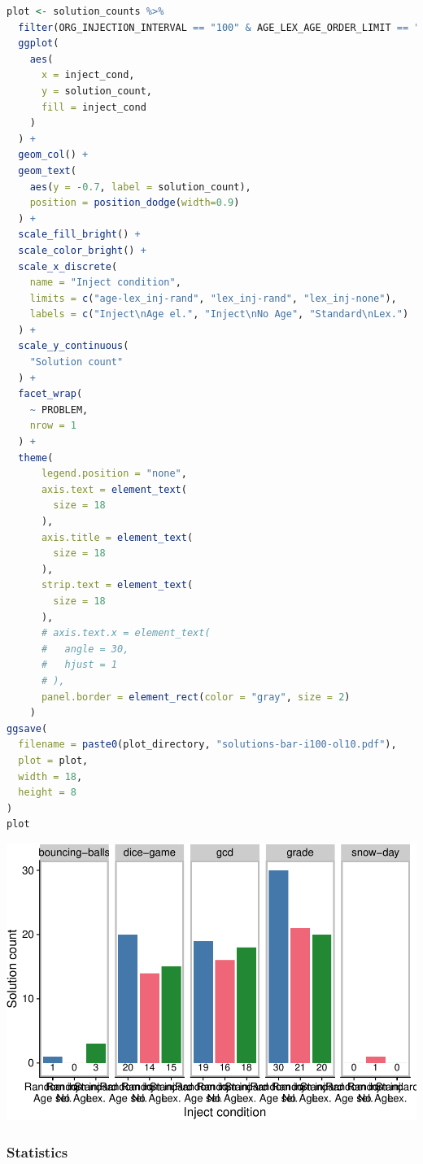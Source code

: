\documentclass[
]{book}
\begin{document}
\begin{lstlisting}[language=R]
plot <- solution_counts %>%
  filter(ORG_INJECTION_INTERVAL == "100" & AGE_LEX_AGE_ORDER_LIMIT == "10") %>%
  ggplot(
    aes(
      x = inject_cond,
      y = solution_count,
      fill = inject_cond
    )
  ) +
  geom_col() +
  geom_text(
    aes(y = -0.7, label = solution_count),
    position = position_dodge(width=0.9)
  ) +
  scale_fill_bright() +
  scale_color_bright() +
  scale_x_discrete(
    name = "Inject condition",
    limits = c("age-lex_inj-rand", "lex_inj-rand", "lex_inj-none"),
    labels = c("Inject\nAge el.", "Inject\nNo Age", "Standard\nLex.")
  ) +
  scale_y_continuous(
    "Solution count"
  ) +
  facet_wrap(
    ~ PROBLEM,
    nrow = 1
  ) +
  theme(
      legend.position = "none",
      axis.text = element_text(
        size = 18
      ),
      axis.title = element_text(
        size = 18
      ),
      strip.text = element_text(
        size = 18
      ),
      # axis.text.x = element_text(
      #   angle = 30,
      #   hjust = 1
      # ),
      panel.border = element_rect(color = "gray", size = 2)
    )
ggsave(
  filename = paste0(plot_directory, "solutions-bar-i100-ol10.pdf"),
  plot = plot,
  width = 18,
  height = 8
)
plot
\end{lstlisting}

\includegraphics{age-based-lex-supplemental_files/figure-latex/unnamed-chunk-8-1.pdf}

\hypertarget{statistics}{%
\subsubsection{Statistics}\label{statistics}}
\end{document}
